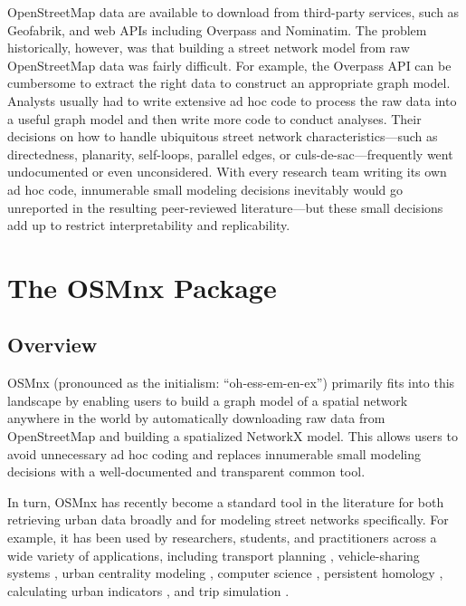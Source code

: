 \documentclass[12pt,letterpaper]{article} %
\begin{document}
OpenStreetMap data are available to download from third-party services, such as Geofabrik, and web APIs including Overpass and Nominatim. The problem historically, however, was that building a street network model from raw OpenStreetMap data was fairly difficult. For example, the Overpass API can be cumbersome to extract the right data to construct an appropriate graph model. Analysts usually had to write extensive ad hoc code to process the raw data into a useful graph model and then write more code to conduct analyses. Their decisions on how to handle ubiquitous street network characteristics---such as directedness, planarity, self-loops, parallel edges, or culs-de-sac---frequently went undocumented or even unconsidered. With every research team writing its own ad hoc code, innumerable small modeling decisions inevitably would go unreported in the resulting peer-reviewed literature---but these small decisions add up to restrict interpretability and replicability.

\section{The OSMnx Package}

\subsection{Overview}

OSMnx (pronounced as the initialism: \enquote{oh-ess-em-en-ex}) primarily fits into this landscape by enabling users to build a graph model of a spatial network anywhere in the world by automatically downloading raw data from OpenStreetMap and building a spatialized NetworkX model. This allows users to avoid unnecessary ad hoc coding and replaces innumerable small modeling decisions with a well-documented and transparent common tool.

In turn, OSMnx has recently become a standard tool in the literature for both retrieving urban data broadly and for modeling street networks specifically. For example, it has been used by researchers, students, and practitioners across a wide variety of applications, including transport planning \citep[e.g.,][]{natera_orozco_data-driven_2020,dumedah_case_2020}, vehicle-sharing systems \citep[e.g.,][]{luo_d3p_2020,zhang_electric_2019}, urban centrality modeling \citep[e.g.,][]{wang_road_2020,torres_alisis_2019}, computer science \citep[e.g.,][]{yin_multi-task_2020,young_automatic_2020}, persistent homology \citep[e.g.,][]{feng_spatial_2020,abdelkader_topological_2018}, calculating urban indicators \citep[e.g.,][]{quistberg_building_2019,wang_impacts_2020}, and trip simulation \citep[e.g.,][]{hernandez-hernandez_anger_2019,merchan_quantifying_2020}.
\end{document}
